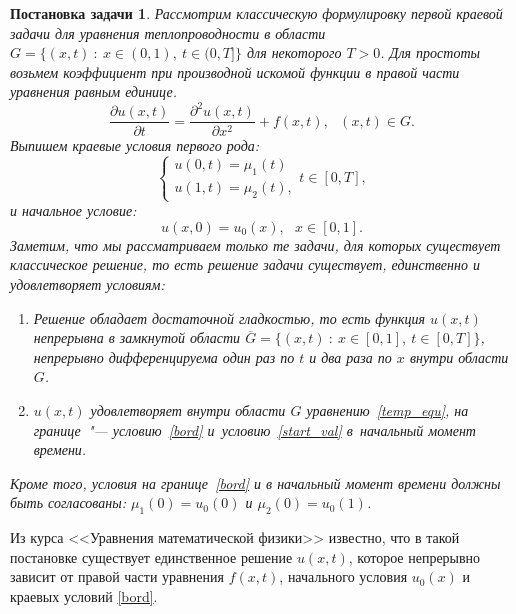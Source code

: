 \documentclass[11pt,a4paper,twoside,listtotoc,bibtotoc]{report}
\numberwithin{equation}{section}
\theoremstyle{definition}
\theoremstyle{plain}
\newtheorem*{formulation*}{Постановка задачи}
\begin{document}
%
\begin{formulation*}
%
    Рассмотрим классическую формулировку первой краевой задачи для уравнения теплопроводности
    в области $G=\{(x, t)~:~x \in (0,1),~t\in (0,T]\}$ для некоторого $T>0$.
    Для простоты возьмем коэффициент при производной искомой функции
    в правой части уравнения равным единице.
    \begin{equation}
        \label{temp_equ}
        \frac{\partial u(x,t)}{\partial t} =
        \frac{\partial^2u(x,t)}{\partial x^2} + f(x,t),
        ~~~(x,t) \in G.
    \end{equation}
    Выпишем краевые условия первого рода:
    \begin{equation}
        \label{bord}
        \begin{cases}
            u(0,t) = \mu_1(t) \\
            u(1,t) = \mu_2(t),
        \end{cases}
        t\in [0,T],
    \end{equation}
    и начальное условие:
    \begin{equation}
        \label{start_val}
        u(x,0) = u_0(x),~~~x\in[0,1].
    \end{equation}
    Заметим, что мы рассматриваем только те задачи, для которых существует
    классическое решение, то есть решение задачи существует, единственно и
    удовлетворяет условиям:
    \begin{enumerate}
        \item Решение обладает достаточной гладкостью, то есть
            функция $u(x,t)$ непрерывна в замкнутой области
            $\overline{G} = \{(x,t)~:~x \in [0,1],~t\in [0,T]\}$, непрерывно
            дифференцируема один раз по $t$ и два раза по $x$ внутри области $G$.
        \item $u(x,t)$ удовлетворяет внутри области $G$ уравнению~\eqref{temp_equ},
            на границе~"--- условию~\eqref{bord} и~условию~\eqref{start_val}
            в~начальный момент времени.
    \end{enumerate}
    Кроме того, условия на границе~\eqref{bord} и в начальный момент времени
    должны быть согласованы: $\mu_1(0) = u_0(0)$ и $\mu_2(0) = u_0(1)$.
%
\end{formulation*}
%

Из курса <<Уравнения математической физики>> известно, что в такой постановке
существует единственное решение $u(x, t)$, которое непрерывно зависит от правой части
уравнения $f(x, t)$, начального условия $u_0(x)$ и краевых условий \eqref{bord}.
\end{document}

